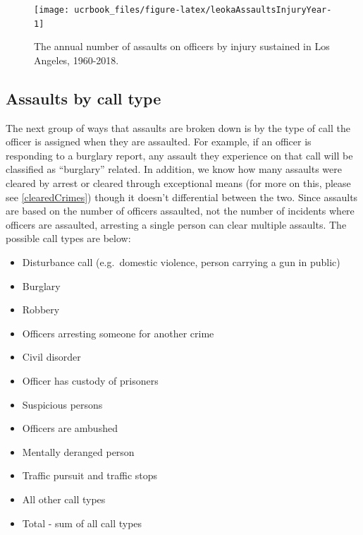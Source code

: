 \documentclass[
  12pt,
  openany]{book}
\providecommand{\tightlist}{%
  \setlength{\itemsep}{0pt}\setlength{\parskip}{0pt}}
\begin{document}
\begin{figure}

{\centering \texttt{[image: ucrbook\_files/figure-latex/leokaAssaultsInjuryYear-1]} 

}

\caption{The annual number of assaults on officers by injury sustained in Los Angeles, 1960-2018.}\label{fig:leokaAssaultsInjuryYear}
\end{figure}

\hypertarget{assaults-by-call-type}{%
\subsection{Assaults by call type}\label{assaults-by-call-type}}

The next group of ways that assaults are broken down is by the type of call the officer is assigned when they are assaulted. For example, if an officer is responding to a burglary report, any assault they experience on that call will be classified as ``burglary'' related. In addition, we know how many assaults were cleared by arrest or cleared through exceptional means (for more on this, please see \ref{clearedCrimes}) though it doesn't differential between the two. Since assaults are based on the number of officers assaulted, not the number of incidents where officers are assaulted, arresting a single person can clear multiple assaults. The possible call types are below:

\begin{itemize}
\tightlist
\item
  Disturbance call (e.g.~domestic violence, person carrying a gun in public)
\item
  Burglary
\item
  Robbery
\item
  Officers arresting someone for another crime
\item
  Civil disorder
\item
  Officer has custody of prisoners
\item
  Suspicious persons
\item
  Officers are ambushed
\item
  Mentally deranged person
\item
  Traffic pursuit and traffic stops
\item
  All other call types
\item
  Total - sum of all call types
\end{itemize}
\end{document}
